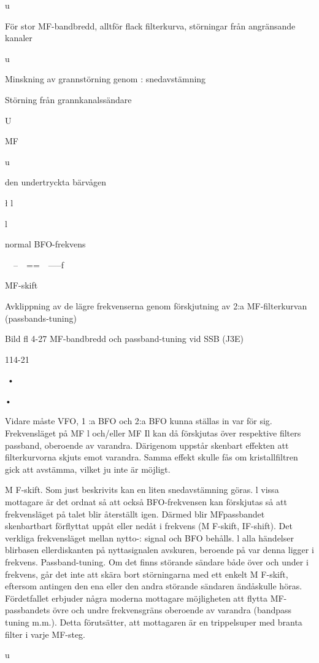 \documentclass[a4paper,twoside,twocolumn,openright]{book}
\begin{document}
{{{u

För stor MF-bandbredd, alltför
flack filterkurva, störningar från
angränsande kanaler

u

Minskning av grannstörning genom :
snedavstämning

Störning från grannkanalssändare

U

MF

u

den undertryckta
bärvågen

\l
l

l

normal BFO-frekvens

~~--~~==~~-----f

MF-skift

Avklippning av de lägre frekvenserna
genom förskjutning av 2:a MF-filterkurvan (passbands-tuning)

Bild fl 4-27 MF-bandbredd och passband-tuning vid SSB (J3E)

114-21

•

•

Vidare måste VFO, 1 :a BFO och 2:a BFO
kunna ställas in var för sig. Frekvensläget
på MF l och/eller MF Il kan då förskjutas
över respektive filters passband, oberoende av varandra. Därigenom uppstår
skenbart effekten att filterkurvorna skjuts
emot varandra. Samma effekt skulle fås
om kristallfiltren gick att avstämma, vilket
ju inte är möjligt.

M F-skift. Som just beskrivits kan en liten
snedavstämning göras. l vissa mottagare
är det ordnat så att också BFO-frekvensen kan förskjutas så att frekvensläget på
talet blir återställt igen. Därmed blir MFpassbandet skenbartbart förflyttat uppåt
eller nedåt i frekvens (M F-skift, IF-shift).
Det verkliga frekvensläget mellan nytto-:
signal och BFO behålls. l alla händelser
blirbasen ellerdiskanten på nyttasignalen
avskuren, beroende på var denna ligger
i frekvens.
Passband-tuning. Om det finns störande
sändare både över och under i frekvens,
går det inte att skära bort störningarna
med ett enkelt M F-skift, eftersom antingen den ena eller den andra störande
sändaren ändåskulle höras. Fördetfallet
erbjuder några moderna mottagare möjligheten att flytta MF-passbandets övre
och undre frekvensgräns oberoende av
varandra (bandpass tuning m.m.). Detta
förutsätter, att mottagaren är en trippelsuper med branta filter i varje MF-steg.

u

}}}
\end{document}
